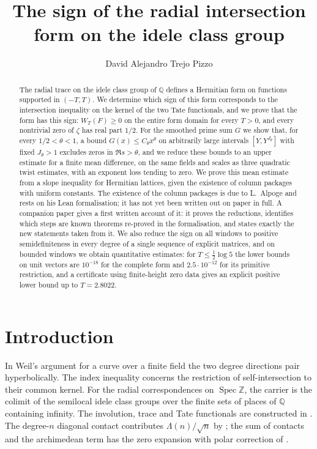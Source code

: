\documentclass[10pt]{amsart}
\theoremstyle{definition}
\theoremstyle{remark}
\begin{document}
\addtolength{\abovedisplayskip}{-3.4pt}
\addtolength{\belowdisplayskip}{-3.4pt}
\addtolength{\belowdisplayshortskip}{-2pt}
\title[The sign of the radial intersection form]{The sign of the radial intersection form on the idele class group}
\author{David Alejandro Trejo Pizzo}
\date{}
\begin{abstract}
The radial trace on the idele class group of $\mathbb Q$ defines a Hermitian
form on functions supported in $(-T,T)$. We determine which sign of this form
corresponds to the intersection inequality on the kernel of the two Tate
functionals, and we prove that the form has this sign: $W_T(F)\ge0$ on the
entire form domain for every $T>0$, and every nontrivial zero of $\zeta$ has
real part $1/2$. For the smoothed prime sum $G$ we show that, for every
$1/2<\theta<1$, a bound $G(x)\le C_\theta x^\theta$ on arbitrarily large
intervals $[Y,Y^{J_\theta}]$ with fixed $J_\theta>1$ excludes zeros in
$\Re s>\theta$, and we reduce these bounds to an upper estimate for a finite
mean difference, on the same fields and scales as three quadratic twist
estimates, with an exponent loss tending to zero. We prove this mean
estimate from a slope inequality for Hermitian lattices, given the existence
of column packages with uniform constants. The existence of the column
packages is due to L.~Alpoge and rests on his Lean formalisation; it has not
yet been written out on paper in full. A companion paper gives a first
written account of it: it proves the reductions, identifies which steps are
known theorems re-proved in the formalisation, and states exactly the new
statements taken from it. We also reduce the sign on all windows to positive
semidefiniteness in every degree of a single sequence of explicit matrices,
and on bounded windows we obtain quantitative estimates: for
$T\le\tfrac12\log5$ the lower bounds on unit vectors are $10^{-18}$ for the
complete form and $2.5\cdot10^{-12}$ for its primitive restriction, and a
certificate using finite-height zero data gives an explicit positive lower
bound up to $T=2.8022$.
\end{abstract}
\maketitle
\setcounter{tocdepth}{1}\tableofcontents
\section{Introduction}\label{sec:intro}
In Weil's argument for a curve over a finite field the two degree
directions pair hyperbolically. The index inequality concerns the
restriction of self-intersection to their common kernel. For the
radial correspondences on $\operatorname{Spec}\mathbb Z$, the
carrier is the colimit of the semilocal idele class groups over the
finite sets of places of $\mathbb Q$ containing infinity. The
involution, trace and Tate functionals are constructed in \cite{P43}.
The degree-$n$ diagonal contact contributes $\Lambda(n)/\sqrt n$
by \cite{P44}; the sum of contacts and the archimedean term has
the zero expansion with polar correction of \cite{Paper45}.
\end{document}
